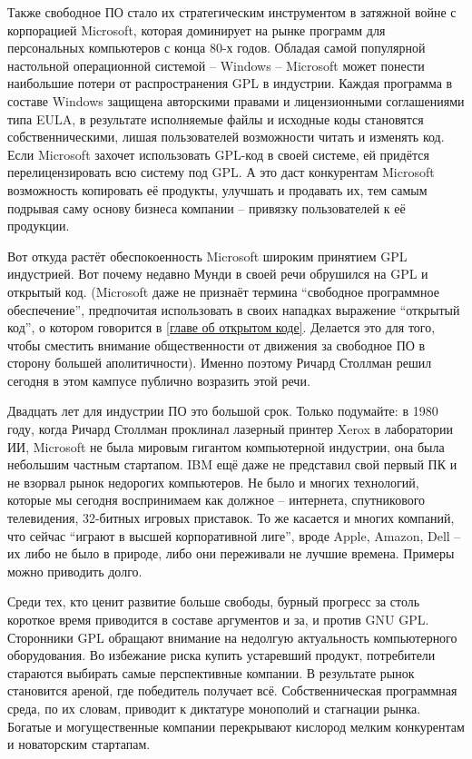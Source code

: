 Также свободное ПО стало их стратегическим инструментом в затяжной войне с корпорацией Microsoft, которая доминирует на рынке программ для персональных компьютеров с конца 80-х годов. Обладая самой популярной настольной операционной системой -- Windows -- Microsoft может понести наибольшие потери от распространения GPL в индустрии. Каждая программа в составе Windows защищена авторскими правами и лицензионными соглашениями типа EULA, в результате исполняемые файлы и исходные коды становятся собственническими, лишая пользователей возможности читать и изменять код. Если Microsoft захочет использовать GPL-код в своей системе, ей придётся перелицензировать всю систему под GPL. А это даст конкурентам Microsoft возможность копировать её продукты, улучшать и продавать их, тем самым подрывая саму основу бизнеса компании -- привязку пользователей к её продукции.

Вот откуда растёт обеспокоенность Microsoft широким принятием GPL индустрией. Вот почему недавно Мунди в своей речи обрушился на GPL и открытый код. (Microsoft даже не признаёт термина ``свободное программное обеспечение'', предпочитая использовать в своих нападках выражение ``открытый код'', о котором говорится в \autoref{главе об открытом коде}. Делается это для того, чтобы сместить внимание общественности от движения за свободное ПО в сторону большей аполитичности). Именно поэтому Ричард Столлман решил сегодня в этом кампусе публично возразить этой речи.

Двадцать лет для индустрии ПО это большой срок. Только подумайте: в 1980 году, когда Ричард Столлман проклинал лазерный принтер Xerox в лаборатории ИИ, Microsoft не была мировым гигантом компьютерной индустрии, она была небольшим частным стартапом. IBM ещё даже не представил свой первый ПК и не взорвал рынок недорогих компьютеров. Не было и многих технологий, которые мы сегодня воспринимаем как должное -- интернета, спутникового телевидения, 32-битных игровых приставок. То же касается и многих компаний, что сейчас ``играют в высшей корпоративной лиге'', вроде Apple, Amazon, Dell -- их либо не было в природе, либо они переживали не лучшие времена. Примеры можно приводить долго.

Среди тех, кто ценит развитие больше свободы, бурный прогресс за столь короткое время приводится в составе аргументов и за, и против GNU GPL. Сторонники GPL обращают внимание на недолгую актуальность компьютерного оборудования. Во избежание риска купить устаревший продукт, потребители стараются выбирать самые перспективные компании. В результате рынок становится ареной, где победитель получает всё.  Собственническая программная среда, по их словам, приводит к диктатуре монополий и стагнации рынка. Богатые и могущественные компании перекрывают кислород мелким конкурентам и новаторским стартапам.

